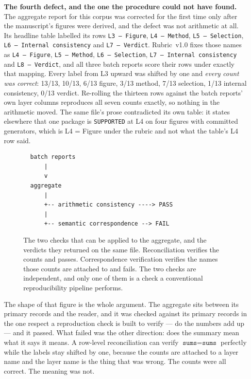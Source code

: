 \documentclass[sigconf,review]{acmart}
\begin{document}
\textbf{The fourth defect, and the one the procedure could not have found.}
The aggregate report for this corpus was corrected for the first time only
after the manuscript's figures were derived, and the defect was not arithmetic
at all. Its headline table labelled its rows \texttt{L3 --- Figure},
\texttt{L4 --- Method}, \texttt{L5 --- Selection}, \texttt{L6 --- Internal
consistency} and \texttt{L7 --- Verdict}. Rubric~v1.0 fixes those names as
\texttt{L4 --- Figure}, \texttt{L5 --- Method}, \texttt{L6 --- Selection},
\texttt{L7 --- Internal consistency} and \texttt{L8 --- Verdict}, and all three
batch reports score their rows under exactly that mapping. Every label from L3
upward was shifted by one and \emph{every count was correct}: 13/13, 10/13,
6/13 figure, 3/13 method, 7/13 selection, 1/13 internal consistency, 0/13
verdict. Re-rolling the thirteen rows against the batch reports' own layer
columns reproduces all seven counts exactly, so nothing in the arithmetic
moved. The same file's prose contradicted its own table: it states elsewhere
that one package is \texttt{SUPPORTED} at L4 on four figures with committed
generators, which is L4 = Figure under the rubric and not what the table's L4
row said.

\begin{figure}[t]
\centering
\caption{The two checks that can be applied to the aggregate, and the verdicts
they returned on the same file. Reconciliation verifies the counts and passes.
Correspondence verification verifies the names those counts are attached to
and fails. The two checks are independent, and only one of them is a check a
conventional reproducibility pipeline performs.}
\label{fig:apparatus}
\small
\begin{verbatim}
  batch reports
      |
      v
  aggregate
      |
      +-- arithmetic consistency ----> PASS
      |
      +-- semantic correspondence --> FAIL
\end{verbatim}
\end{figure}

The shape of that figure is the whole argument. The aggregate sits between its
primary records and the reader, and it was checked against its primary records
in the one respect a reproduction check is built to verify --- do the numbers
add up --- and it passed. What failed was the other direction: does the
summary mean what it says it means. A row-level reconciliation can verify
$\texttt{sums} = \texttt{sums}$ perfectly while the labels stay shifted by
one, because the counts are attached to a layer name and the layer name is the
thing that was wrong. The counts were all correct. The meaning was not.
\end{document}
